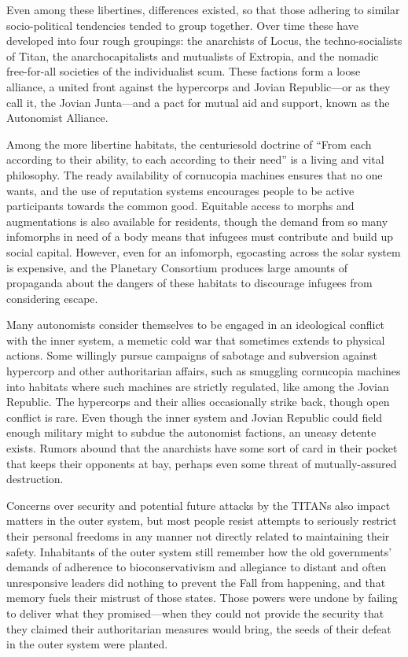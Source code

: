 Even among these libertines, differences existed, so that those adhering to similar socio-political tendencies tended to group together. Over time these have developed into four rough groupings: the anarchists of Locus, the techno-socialists of Titan, the anarchocapitalists and mutualists of Extropia, and the nomadic free-for-all societies of the individualist scum. These factions form a loose alliance, a united front against the hypercorps and Jovian Republic—or as they call it, the Jovian Junta—and a pact for mutual aid and support, known as the Autonomist Alliance. 

Among the more libertine habitats, the centuriesold doctrine of “From each according to their ability, to each according to their need” is a living and vital philosophy. The ready availability of cornucopia machines ensures that no one wants, and the use of reputation systems encourages people to be active participants towards the common good. Equitable access to morphs and augmentations is also available for residents, though the demand from so many infomorphs in need of a body means that infugees must contribute and build up social capital. However, even for an infomorph, egocasting across the solar system is expensive, and the Planetary Consortium produces large amounts of propaganda about the dangers of these habitats to discourage infugees from considering escape. 

Many autonomists consider themselves to be engaged in an ideological conflict with the inner system, a memetic cold war that sometimes extends to physical actions. Some willingly pursue campaigns of sabotage and subversion against hypercorp and other authoritarian affairs, such as smuggling cornucopia machines into habitats where such machines are strictly regulated, like among the Jovian Republic. The hypercorps and their allies occasionally strike back, though open conflict is rare. Even though the inner system and Jovian Republic could field enough military might to subdue the autonomist factions, an uneasy detente exists. Rumors abound that the anarchists have some sort of card in their pocket that keeps their opponents at bay, perhaps even some threat of mutually-assured destruction. 

Concerns over security and potential future attacks by the TITANs also impact matters in the outer system, but most people resist attempts to seriously restrict their personal freedoms in any manner not directly related to maintaining their safety. Inhabitants of the outer system still remember how the old governments' demands of adherence to bioconservativism and allegiance to distant and often unresponsive leaders did nothing to prevent the Fall from happening, and that memory fuels their mistrust of those states. Those powers were undone by failing to deliver what they promised—when they could not provide the security that they claimed their authoritarian measures would bring, the seeds of their defeat in the outer system were planted. 

